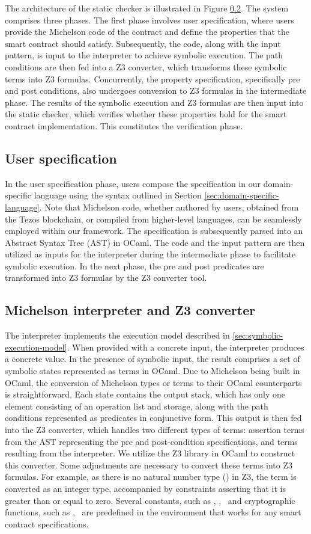 \documentclass[a4paper,UKenglish,cleveref, autoref, thm-restate]{lipics-v2021}
\begin{document}
The architecture of the static checker is illustrated in Figure \ref{}. The system comprises three phases. The first phase involves user specification, where users provide the Michelson code of the contract and define the properties that the smart contract should satisfy. Subsequently, the code, along with the input pattern, is input to the interpreter to achieve symbolic execution. The path conditions are then fed into a Z3 converter, which transforms these symbolic terms into Z3 formulas. Concurrently, the property specification, specifically pre and post conditions, also undergoes conversion to Z3 formulas in the intermediate phase. The results of the symbolic execution and Z3 formulas are then input into the static checker, which verifies whether these properties hold for the smart contract implementation. This constitutes the verification phase.

\subsection{User specification}
In the user specification phase, users compose the specification in our domain-specific language using the syntax outlined in Section \ref{sec:domain-specific-language}. Note that Michelson code, whether authored by users, obtained from the Tezos blockchain, or compiled from higher-level languages, can be seamlessly employed within our framework. The specification is subsequently parsed into an Abstract Syntax Tree (AST) in OCaml. The code and the input pattern are then utilized as inputs for the interpreter during the intermediate phase to facilitate symbolic execution. In the next phase, the pre and post predicates are transformed into Z3 formulas by the Z3 converter tool.
\subsection{Michelson interpreter and Z3 converter}
The interpreter implements the execution model described in \ref{sec:symbolic-execution-model}. When provided with a concrete input, the interpreter produces a concrete value. In the presence of symbolic input, the result comprises a set of symbolic states represented as terms in OCaml. Due to Michelson being built in OCaml, the conversion of Michelson types or terms to their OCaml counterparts is straightforward. Each state contains the output stack, which has only one element consisting of an operation list and storage, along with the path conditions represented as predicates in conjunctive form. This output is then fed into the Z3 converter, which handles two different types of terms: assertion terms from the AST representing the pre and post-condition specifications, and terms resulting from the interpreter. We utilize the Z3 library in OCaml to construct this converter. Some adjustments are necessary to convert these terms into Z3 formulas. For example, as there is no natural number type (\TNAT) in Z3, the term is converted as an integer type, accompanied by constraints asserting that it is greater than or equal to zero. Several constants, such as \CAMOUNT, \CBALANCE, \CSENDER\ and cryptographic functions, such as \FSHA, \FHASHKEY\ are predefined in the environment that works for any smart contract specifications.
\end{document}
